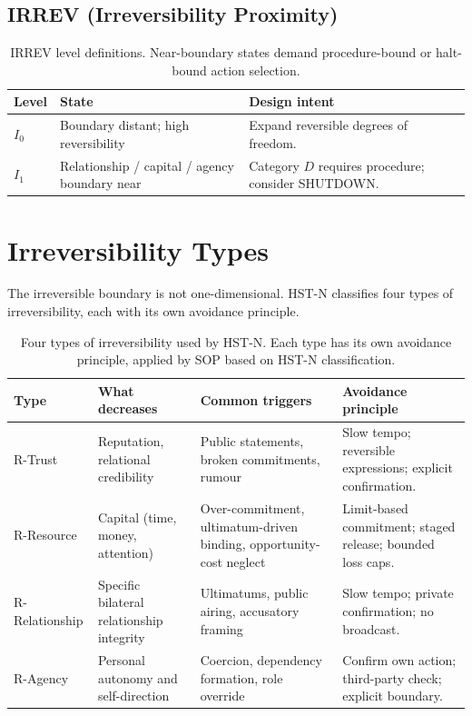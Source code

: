 \subsection{IRREV (Irreversibility Proximity)}
\label{sec:hstn-irrev}

\begin{table}[ht]
\centering
\small
\begin{tabularx}{\linewidth}{lXX}
\toprule
\textbf{Level} & \textbf{State} & \textbf{Design intent} \\
\midrule
$I_0$
& Boundary distant; high reversibility
& Expand reversible degrees of freedom. \\

$I_1$
& Relationship / capital / agency boundary near
& Category $D$ requires procedure; consider SHUTDOWN. \\
\bottomrule
\end{tabularx}
\caption[HST-N IRREV levels]{IRREV level definitions. Near-boundary
states demand procedure-bound or halt-bound action selection.}
\label{tab:hstn-irrev}
\end{table}

\section{Irreversibility Types}
\label{sec:hstn-irrev-types}

The irreversible boundary is not one-dimensional. HST-N classifies
four types of irreversibility, each with its own avoidance principle.

\begin{table}[ht]
\centering
\small
\begin{tabularx}{\linewidth}{lXXX}
\toprule
\textbf{Type} & \textbf{What decreases} & \textbf{Common triggers} & \textbf{Avoidance principle} \\
\midrule
R-Trust
& Reputation, relational credibility
& Public statements, broken commitments, rumour
& Slow tempo; reversible expressions; explicit confirmation. \\

R-Resource
& Capital (time, money, attention)
& Over-commitment, ultimatum-driven binding, opportunity-cost
neglect
& Limit-based commitment; staged release; bounded loss caps. \\

R-Relationship
& Specific bilateral relationship integrity
& Ultimatums, public airing, accusatory framing
& Slow tempo; private confirmation; no broadcast. \\

R-Agency
& Personal autonomy and self-direction
& Coercion, dependency formation, role override
& Confirm own action; third-party check; explicit boundary. \\
\bottomrule
\end{tabularx}
\caption[Irreversibility types]{Four types of irreversibility used
by HST-N. Each type has its own avoidance principle, applied by
SOP based on HST-N classification.}
\label{tab:hstn-irrev-types}
\end{table}

